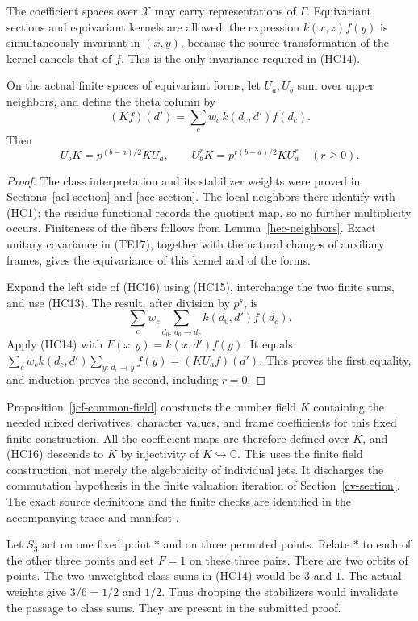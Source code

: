 The coefficient spaces over $\mathscr X$ may carry representations
of $\Gamma$. Equivariant sections and equivariant kernels are allowed:
the expression $k(x,z)f(y)$ is simultaneously invariant in $(x,y)$,
because the source transformation of the kernel cancels that of $f$.
This is the only invariance required in (HC14).

\begin{theorem}\label{hec-global-identity}
On the actual finite spaces of equivariant forms, let $U_a,U_b$
sum over upper neighbors, and define the theta column by
\[
              (Kf)(d')=\sum_c w_c\,k(d_c,d')f(d_c).
 \tag{HC15}
\]
Then
\[
                  U_bK=p^{(b-a)/2}KU_a,
 \qquad U_b^rK=p^{r(b-a)/2}KU_a^r\quad(r\ge0).
 \tag{HC16}
\]
\end{theorem}
\begin{proof}
The class interpretation and its stabilizer weights were proved in
Sections~\ref{acl-section} and \ref{acc-section}. The local neighbors
there identify with (HC1); the residue functional records the
quotient map, so no further multiplicity occurs. Finiteness of the
fibers follows from Lemma~\ref{hec-neighbors}. Exact unitary
covariance in (TE17), together with the natural changes of auxiliary
frames, gives the equivariance of this kernel and of the forms.

Expand the left side of (HC16) using (HC15), interchange the two
finite sums, and use (HC13). The result, after division by $p^s$, is
\[
 \sum_c w_c\sum_{d_0:\,d_0\to d_c} k(d_0,d')f(d_c).
\]
Apply (HC14) with $F(x,y)=k(x,d')f(y)$. It equals
$\sum_c w_c k(d_c,d')\sum_{y:\,d_c\to y}f(y)=(KU_af)(d')$.
This proves the first equality, and induction proves the second,
including $r=0$.
\end{proof}

Proposition~\ref{jcf-common-field} constructs the number field $K$
containing the needed mixed derivatives, character values, and frame
coefficients for this fixed finite construction. All the coefficient
maps are therefore defined over $K$, and (HC16) descends to $K$ by
injectivity of $K\hookrightarrow\mathbb C$. This uses the finite
field construction, not merely the algebraicity of individual jets.
It discharges the commutation hypothesis in the finite valuation
iteration of Section~\ref{cv-section}. The exact source definitions
and the finite checks are identified in the accompanying trace
and manifest \cite{alpo-uniform-source}.

\begin{example}
Let $S_3$ act on one fixed point $*$ and on three permuted points.
Relate $*$ to each of the other three points and set $F=1$ on these
three pairs. There are two orbits of points. The two unweighted
class sums in (HC14) would be $3$ and $1$. The actual weights give
$3/6=1/2$ and $1/2$. Thus dropping the stabilizers would invalidate
the passage to class sums. They are present in the submitted proof.
\end{example}


